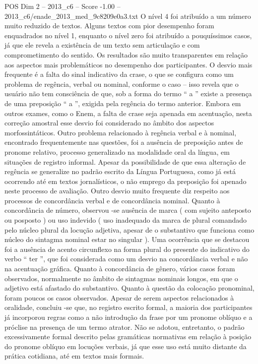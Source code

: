 \begin{textsample}{POS Dim 2 – 2013\_c6 – Score -1.00 – 2013\_c6/enade\_2013\_med\_9c8209e0a3.txt}
O nível 4 foi atribuído a um número muito reduzido de textos.
Alguns textos com pior desempenho foram enquadrados no nível 1, enquanto o nível zero foi atribuído a pouquíssimos casos, já que ele revela a existência de um texto sem articulação e com comprometimento do sentido.
Os resultados são muito transparentes em relação aos aspectos mais problemáticos no desempenho dos participantes.
O desvio mais frequente é a falta do sinal indicativo da crase, o que se configura como um problema de regência, verbal ou nominal, conforme o caso – isso revela que o usuário não tem consciência de que, sob a forma do termo “ a ” existe a presença de uma preposição “ a ”, exigida pela regência do termo anterior.
Embora em outros exames, como o Enem, a falta de crase seja apenada em acentuação, nesta correção amostral esse desvio foi considerado no âmbito dos aspectos morfossintáticos.
Outro problema relacionado à regência verbal e à nominal, encontrado frequentemente nas questões, foi a ausência de preposição antes de pronome relativo, processo generalizado na modalidade oral da língua, em situações de registro informal.
Apesar da possibilidade de que essa alteração de regência se generalize no padrão escrito da Língua Portuguesa, como já está ocorrendo até em textos jornalísticos, o não emprego da preposição foi apenado neste processo de avaliação.
Outro desvio muito frequente diz respeito aos processos de concordância verbal e de concordância nominal.
Quanto à concordância de número, observou -se ausência de marca ( com sujeito anteposto ou posposto ) ou uso indevido ( uso inadequado da marca de plural comandado pelo núcleo plural da locução adjetiva, apesar de o substantivo que funciona como núcleo do sintagma nominal estar no singular ).
Uma ocorrência que se destacou foi a ausência de acento circunflexo na forma plural do presente do indicativo do verbo “ ter ”, que foi considerada como um desvio na concordância verbal e não na acentuação gráfica.
Quanto à concordância de gênero, vários casos foram observados, normalmente no âmbito de sintagmas nominais longos, em que o adjetivo está afastado do substantivo.
Quanto à questão da colocação pronominal, foram poucos os casos observados.
Apesar de serem aspectos relacionados à oralidade, concluiu -se que, no registro escrito formal, a maioria dos participantes já incorporou regras como a não introdução da frase por um pronome oblíquo e a próclise na presença de um termo atrator.
Não se adotou, entretanto, o padrão excessivamente formal descrito pelas gramáticas normativas em relação à posição do pronome oblíquo em locuções verbais, já que esse uso está muito distante da prática cotidiana, até em textos mais formais.

\end{textsample}
